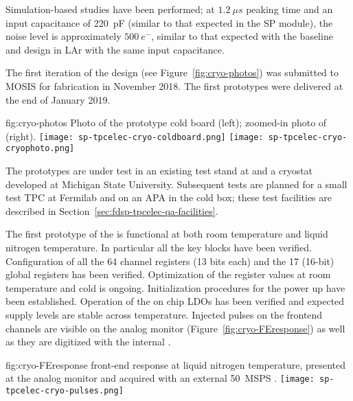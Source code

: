 Simulation-based studies have been performed; at $\SI{1.2}{{\mu}s}$ peaking time and an input capacitance of \SI{220}{pF} (similar to that expected in the SP module), the noise level is approximately $\SI{500}{e^{-}}$, similar to that expected with the baseline  and   design in LAr with the same input capacitance.

The first iteration of the   design (see Figure~\ref{fig:cryo-photos}) was submitted to MOSIS for fabrication in November 2018. The first prototypes were delivered at the end of January 2019.

\begin{dunefigure}
{fig:cryo-photos}
{Photo of the prototype cold board (left); zoomed-in photo of   (right).}
\texttt{[image: sp-tpcelec-cryo-coldboard.png]}
\hspace{1cm}
\texttt{[image: sp-tpcelec-cryo-cryophoto.png]}
\end{dunefigure}

The prototypes are under test in an existing test stand at  and a cryostat developed at Michigan State University. Subsequent tests are planned for a small test TPC at Fermilab and on an APA in the  cold box; these test facilities are described in Section~\ref{sec:fdsp-tpcelec-qa-facilities}.

The first prototype of the  is functional at both room temperature and liquid nitrogen temperature. In particular all the key blocks have been verified. Configuration of all the 64 channel registers (13 bits each) and the 17 (16-bit) global registers has been verified. Optimization of the register values at room temperature and cold is ongoing. Initialization procedures for the  power up have been established. Operation of the on chip LDOs has been verified and expected supply levels are stable across temperature. Injected pulses on the frontend channels are visible on the analog monitor (Figure~\ref{fig:cryo-FEresponse}) as well as they are digitized with the internal .

\begin{dunefigure}
{fig:cryo-FEresponse}
{  front-end response at liquid nitrogen temperature, presented at the analog monitor and acquired with an external \SI{50}{MSPS} .}
\texttt{[image: sp-tpcelec-cryo-pulses.png]}
\end{dunefigure}

